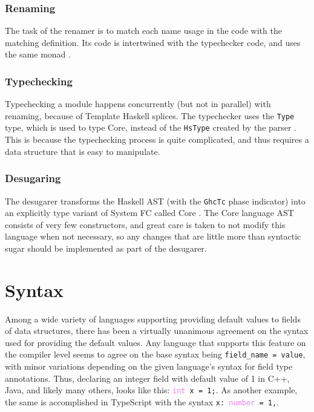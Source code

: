 \documentclass[en]{pracamgr}
\begin{document}
\subsection{Renaming}
The task of the renamer is to match each name usage in the code with the matching definition. 
Its code is intertwined with the typechecker code, and uses the same monad \cite{RenamerWiki}.

\subsection{Typechecking}
Typechecking a module happens concurrently (but not in parallel) with renaming, because of Template Haskell splices.
The typechecker uses the \texttt{Type} type, which is used to type Core, instead of the \texttt{HsType} created by the parser \cite{TypecheckerWiki}.
This is because the typechecking process is quite complicated, and thus requires a data structure that is easy to manipulate.

\subsection{Desugaring}
The desugarer transforms the Haskell AST (with the \texttt{GhcTc} phase indicator) into an explicitly type variant of System FC called Core \cite{CoreWiki}.
The Core language AST consists of very few constructors, and great care is taken to not modify this language when not necessary, 
so any changes that are little more than syntactic sugar should be implemented as part of the desugarer.

\chapter{Syntax}
Among a wide variety of languages supporting providing default values to fields of data structures, there has been a virtually unanimous agreement on the syntax used for providing the default values.
Any language that supports this feature on the compiler level seems to agree on the base syntax being \texttt{field\_name = value}, with minor variations depending on the given language's syntax for field type annotations.
Thus, declaring an integer field with default value of 1 in C++, Java, and likely many others, looks like this: \texttt{\textcolor{Violet}{int} x = \textcolor{BrickRed}{1};}.
As another example, the same is accomplished in TypeScript with the syntax \texttt{x:\ \textcolor{Violet}{number} = \textcolor{BrickRed}{1},}.
\end{document}
